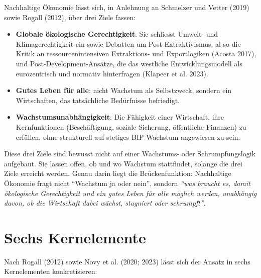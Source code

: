 \documentclass[
  nswissgerman,
  a4paper,
  DIV=11,
  numbers=noendperiod,
  oneside,
  openany]{scrreprt}
\begin{document}
Nachhaltige Ökonomie lässt sich, in Anlehnung an Schmelzer und Vetter
(2019) sowie Rogall (2012), über drei Ziele fassen:

\begin{itemize}
\item
  \textbf{Globale ökologische Gerechtigkeit}: Sie schliesst Umwelt- und
  Klimagerechtigkeit ein sowie Debatten um Post-Extraktivismus, al-so
  die Kritik an ressourcenintensiven Extraktions- und Exportlogiken
  (Acosta 2017), und Post-Development-Ansätze, die das westliche
  Entwicklungsmodell als eurozentrisch und normativ hinterfragen
  (Klapeer et al. 2023).
\item
  \textbf{Gutes Leben für alle}: nicht Wachstum als Selbstzweck, sondern
  ein Wirtschaften, das tatsächliche Bedürfnisse befriedigt.
\item
  \textbf{Wachstumsunabhängigkeit}: Die Fähigkeit einer Wirtschaft, ihre
  Kernfunktionen (Beschäftigung, soziale Sicherung, öffentliche
  Finanzen) zu erfüllen, ohne strukturell auf stetiges BIP-Wachstum
  angewiesen zu sein.
\end{itemize}

Diese drei Ziele sind bewusst nicht auf einer Wachstums- oder
Schrumpfungslogik aufgebaut. Sie lassen offen, ob und wo Wachstum
stattfindet, solange die drei Ziele erreicht werden. Genau darin liegt
die Brückenfunktion: Nachhaltige Ökonomie fragt nicht ``Wachstum ja oder
nein'', sondern \emph{``was braucht es, damit ökologische Gerechtigkeit
und ein gutes Leben für alle möglich werden, unabhängig davon, ob die
Wirtschaft dabei wächst, stagniert oder schrumpft''}.

\section{Sechs Kernelemente}\label{sechs-kernelemente}

Nach Rogall (2012) sowie Novy et al. (2020; 2023) lässt sich der Ansatz
in sechs Kernelementen konkretisieren:
\end{document}
